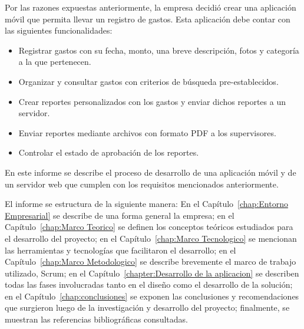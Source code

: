 Por las razones expuestas anteriormente, la empresa decidió crear una aplicación móvil que permita llevar un registro de gastos. Esta aplicación debe contar con las siguientes funcionalidades:

\begin{itemize}
\item Registrar gastos con su fecha, monto, una breve descripción, fotos y categoría a la que pertenecen.
\item Organizar y consultar gastos con criterios de búsqueda pre-establecidos.
\item Crear reportes personalizados con los gastos y enviar dichos reportes a un servidor.
\item Enviar reportes mediante archivos con formato PDF a los supervisores.
\item Controlar el estado de aprobación de los reportes.
\end{itemize}

En este informe se describe el proceso de desarrollo de una aplicación móvil y de un servidor web que cumplen con los requisitos mencionados anteriormente.

El informe se estructura de la siguiente manera: En el Capítulo~\ref{chap:Entorno Empresarial} se describe de una forma general la empresa; en el Capítulo~\ref{chap:Marco Teorico} se definen los conceptos teóricos estudiados para el desarrollo del proyecto; en el Capítulo~\ref{chap:Marco Tecnologico} se mencionan las herramientas y tecnologías que facilitaron el desarrollo; en el Capítulo~\ref{chap:Marco Metodologico} se describe brevemente el marco de trabajo utilizado, Scrum; en el Capítulo~\ref{chapter:Desarrollo de la aplicacion} se describen todas las fases involucradas tanto en el diseño como el desarrollo de la solución; en el Capítulo~\ref{chap:conclusiones} se exponen las conclusiones y recomendaciones que surgieron luego de la investigación y desarrollo del proyecto; finalmente, se muestran las referencias bibliográficas consultadas.